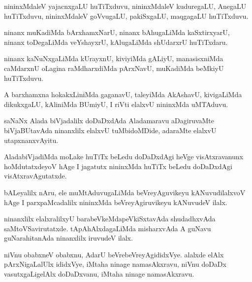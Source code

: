 \documentclass{article}
\begin{document}
\begin{mn}
nininxMdaleV yajacnxgaLU huTiTxduvu, nininxMdaleV kuduregaLU, AnegaLU
huTiTxduvu, nininxMdaleV goVvugaLU, pakiSxgaLU, maqgagaLU huTiTxduvu.
\end{mn}

\begin{mn}
ninanx muKadiMda bArxhamxNarU, ninanx bAhugaLiMda kaSxtirxyarU, ninanx
toDegaLiMda veYshayxrU, kAlugaLiMda shUdarxrU huTiTxdaru.
\end{mn}

\begin{mn}
ninanx kaNuNxgaLiMda kUrayxnU, kiviyiMda gALiyU, manasisxniMda
caMdarxnU oLagina raMdharxdiMda pArxNavU, muKadiMda beMkiyU huTiTxduvu.
\end{mn}

\begin{mn}%
A barxhamxna hokakxLiniMda gaganavU, taleyiMda AkAshavU, kivigaLiMda
dikukxgaLU, kAliniMda BUmiyU, I riVti elalxvU nininxMda uMTAduvu.
\end{mn}

\begin{mn}%
saNaNx Alada biVjadalilx doDaDxdAda Aladamaravu aDagiruvaMte
biVjaBUtavAda ninanxlilx elalxvU tuMbidoMDide, adaraMte elalxvU utapxnanxvAyitu.
\end{mn}

\begin{mn}
AladabiVjadiMda moLake huTiTx beLedu doDaDxdAgi heVge visAtxravanunx
hoMdutatxdeyoV hAge I jagatutx nininxMda huTiTx beLedu doDaDxdAgi visAtxravAgutatxde.
\end{mn}

\begin{mn}%
bALeyalilx nAru, ele muMtAduvugaLiMda beVreyAguvikeyu kANuvudilalxvoV
hAge I parxpaMcadalilx nininxMda beVreyAgiruvikeyu kANuvudeV ilalx.
\end{mn}

\begin{mn}
ninanxlilx elalxralilxyU barabeVkeMdapeVkiSxtavAda shudadhxvAda
saMtoVSavirutatxde. tApAhAlxdagaLiMda misharxvAda A guNavu
guNarahitanAda ninanxlilx iruvudeV ilalx.
\end{mn}

\begin{mn}
niVnu obabxneV obabxnu, AdarU beVrebeVreyAgididxVye. alalxde elAlx
pArxNigaLalUlx ididxVye, iMtaha ninage namasAkxravu, niVnu doDaDx
vasutxgaLigelAlx doDaDxvanu, iMtaha ninage namasAkxravu.
\end{mn}
\end{document}
